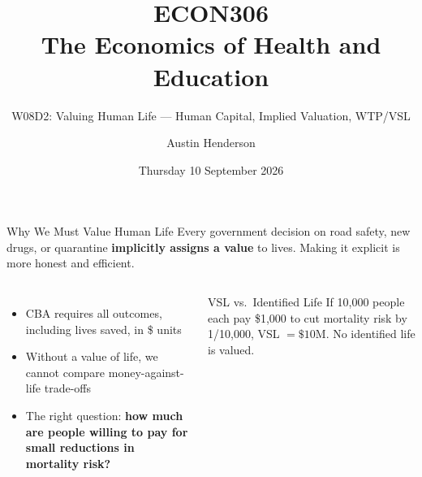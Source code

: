 \documentclass[aspectratio=169, 12pt]{beamer}
\title[ECON306: W08D2 — Valuing Human Life]{ECON306\\The Economics of Health and Education}
\subtitle{W08D2: Valuing Human Life --- Human Capital, Implied Valuation, WTP/VSL}
\author{Austin Henderson}
\institute{Department of Economics\\University of Otago}
\date{Thursday 10 September 2026}
\begin{document}
\begin{frame}[plain]
  \titlepage
\end{frame}



\begin{frame}{Why We Must Value Human Life}
  \small
  Every government decision on road safety, new drugs, or quarantine \textbf{implicitly assigns a value} to lives. Making it explicit is more honest and efficient.
  \vspace{0.25em}
  \begin{columns}
      \begin{itemize}
        \item CBA requires all outcomes, including lives saved, in \$ units
        \item Without a value of life, we cannot compare money-against-life trade-offs
        \item The right question: \textbf{how much are people willing to pay for small reductions in mortality risk?}
      \end{itemize}
      \begin{alertblock}{VSL vs.\ Identified Life}
        If 10,000 people each pay \$1,000 to cut mortality risk by 1/10,000, VSL $= \$10$M. No identified life is valued.
      \end{alertblock}
  \end{columns}
\end{frame}
\end{document}
